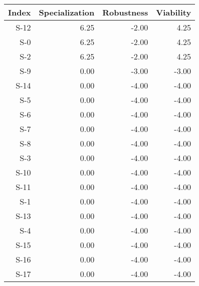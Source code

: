 \begin{tabular}{ | r | r | r | r | }
    \hline
                 Index  &  Specialization  &      Robustness  &       Viability  \\
    \hline
    \hline
                  S-12  &            6.25  &           -2.00  &            4.25  \\
    \hline
                   S-0  &            6.25  &           -2.00  &            4.25  \\
    \hline
                   S-2  &            6.25  &           -2.00  &            4.25  \\
    \hline
                   S-9  &            0.00  &           -3.00  &           -3.00  \\
    \hline
                  S-14  &            0.00  &           -4.00  &           -4.00  \\
    \hline
                   S-5  &            0.00  &           -4.00  &           -4.00  \\
    \hline
                   S-6  &            0.00  &           -4.00  &           -4.00  \\
    \hline
                   S-7  &            0.00  &           -4.00  &           -4.00  \\
    \hline
                   S-8  &            0.00  &           -4.00  &           -4.00  \\
    \hline
                   S-3  &            0.00  &           -4.00  &           -4.00  \\
    \hline
                  S-10  &            0.00  &           -4.00  &           -4.00  \\
    \hline
                  S-11  &            0.00  &           -4.00  &           -4.00  \\
    \hline
                   S-1  &            0.00  &           -4.00  &           -4.00  \\
    \hline
                  S-13  &            0.00  &           -4.00  &           -4.00  \\
    \hline
                   S-4  &            0.00  &           -4.00  &           -4.00  \\
    \hline
                  S-15  &            0.00  &           -4.00  &           -4.00  \\
    \hline
                  S-16  &            0.00  &           -4.00  &           -4.00  \\
    \hline
                  S-17  &            0.00  &           -4.00  &           -4.00  \\

\end{tabular}
